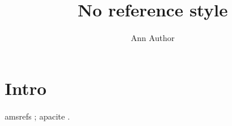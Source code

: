 \documentclass{WileyNJD-v1}
\begin{document}
\title{No reference style}
\author{Ann Author}
\maketitle
\section{Intro}
amsrefs ; apacite .
\end{document}
